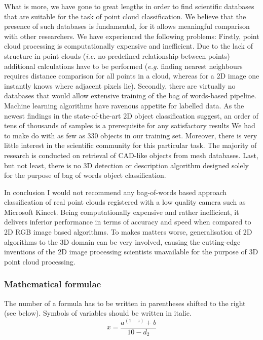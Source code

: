 \documentclass[11pt,twoside]{article}
\begin{document}
  What is more, we have gone to great lengths in order to find scientific databases that are suitable for the task of point cloud classification. We believe that the presence of such databases is fundamental, for it allows meaningful comparison with other researchers. We have experienced the following problems: Firstly, point cloud processing is computationally expensive and inefficient. Due to the lack of structure in point clouds (\textit{i.e.} no predefined relationship between points) additional calculations have to be performed (\textit{e.g.} finding nearest neighbours requires distance comparison for all points in a cloud, whereas for a 2D image one instantly knows where adjacent pixels lie). Secondly, there are virtually no databases that would allow extensive training of the bag of words-based pipeline. Machine learning algorithms have ravenous appetite for labelled data. As the newest findings in the state-of-the-art 2D object classification suggest, an order of tens of thousands of samples is a prerequisite for any satisfactory results We had to make do with as few as 330 objects in our training set. Moreover, there is very little interest in the scientific community for this particular task. The majority of research is conducted on retrieval of CAD-like objects from mesh databases. Last, but not least, there is no 3D detection or description algorithm designed solely for the purpose of bag of words object classification.

  In conclusion I would not recommend any bag-of-words based approach classification of real point clouds registered with a low quality camera such as Microsoft Kinect. Being computationally expensive and rather inefficient, it delivers inferior performance in terms of accuracy and speed when compared to 2D RGB image based algorithms. To makes matters worse, generalisation of 2D algorithms to the 3D domain can be very involved, causing the cutting-edge inventions of the 2D image processing scientists unavailable for the purpose of 3D point cloud processing.

\subsubsection{\small Mathematical formulae}

 The number of a formula has to be written
 in parentheses shifted to the right (see below). Symbols of variables 
 should be written in italic.
 \begin{equation}
   x = \frac{a^{(1-z)} + b}{10 - d_2}
 \end{equation}
\end{document}
